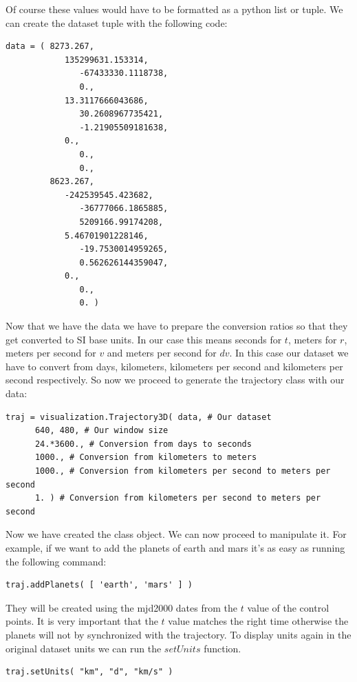 \documentclass[a4paper,11pt]{article}
\begin{document}
Of course these values would have to be formatted as a python list or tuple. We can create the dataset tuple with the following code:

\begin{verbatim}
data = ( 8273.267,
            135299631.153314,
               -67433330.1118738,
               0.,
            13.3117666043686,
               30.2608967735421,
               -1.21905509181638,
            0.,
               0.,
               0.,
         8623.267,
            -242539545.423682,
               -36777066.1865885,
               5209166.99174208,
            5.46701901228146,
               -19.7530014959265,
               0.562626144359047,
            0.,
               0.,
               0. )
\end{verbatim}

Now that we have the data we have to prepare the conversion ratios so that they get converted to \gls{SI}\cite{siunits} base units. In our case this means seconds for $t$, meters for $r$, meters per second for $v$ and meters per second for $dv$. In this case our dataset we have to convert from days, kilometers, kilometers per second and kilometers per second respectively. So now we proceed to generate the trajectory class with our data:

\begin{verbatim}
traj = visualization.Trajectory3D( data, # Our dataset
      640, 480, # Our window size
      24.*3600., # Conversion from days to seconds
      1000., # Conversion from kilometers to meters
      1000., # Conversion from kilometers per second to meters per second
      1. ) # Conversion from kilometers per second to meters per second
\end{verbatim}

Now we have created the class object. We can now proceed to manipulate it. For example, if we want to add the planets of earth and mars it's as easy as running the following command:

\begin{verbatim}
traj.addPlanets( [ 'earth', 'mars' ] )
\end{verbatim}

They will be created using the \gls{mjd2000} dates from the $t$ value of the control points. It is very important that the $t$ value matches the right time otherwise the planets will not by synchronized with the trajectory. To display units again in the original dataset units we can run the $setUnits$ function.

\begin{verbatim}
traj.setUnits( "km", "d", "km/s" )
\end{verbatim}
\end{document}
